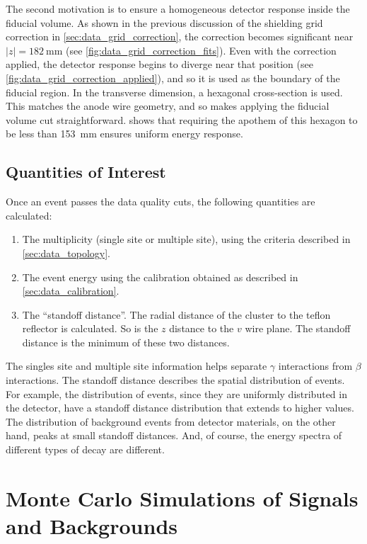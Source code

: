 \documentclass[herrin-thesis.tex]{subfiles}
\begin{document}
The second motivation is to ensure a homogeneous detector response inside the fiducial volume. As shown in the previous discussion of the shielding grid correction in \cref{sec:data_grid_correction}, the correction becomes significant near \(|z|=\SI{182}{\mm}\) (see \cref{fig:data_grid_correction_fits}). Even with the correction applied, the detector response begins to diverge near that position (see \cref{fig:data_grid_correction_applied}), and so it is used as the boundary of the fiducial region. In the transverse dimension, a hexagonal cross-section is used. This matches the anode wire geometry, and so makes applying the fiducial volume cut straightforward.  shows that requiring the apothem of this hexagon to be less than \SI{153}{\mm} ensures uniform energy response.

\subsection{Quantities of Interest}
Once an event passes the data quality cuts, the following quantities are calculated:
\begin{enumerate}
\item The multiplicity (single site or multiple site), using the criteria described in \cref{sec:data_topology}.
\item The event energy using the calibration obtained as described in \cref{sec:data_calibration}.
\item The ``standoff distance''. The radial distance of the cluster to the teflon reflector is calculated. So is the \(z\) distance to the \(v\) wire plane. The standoff distance is the minimum of these two distances.
\end{enumerate}

The singles site and multiple site information helps separate \(\gamma\) interactions from \(\beta\) interactions. The standoff distance describes the spatial distribution of events. For example, the distribution of \twonu{} events, since they are uniformly distributed in the detector, have a standoff distance distribution that extends to higher values. The distribution of background events from detector materials, on the other hand, peaks at small standoff distances. And, of course, the energy spectra of different types of decay are different.

\section{Monte Carlo Simulations of Signals and Backgrounds}
\end{document}
